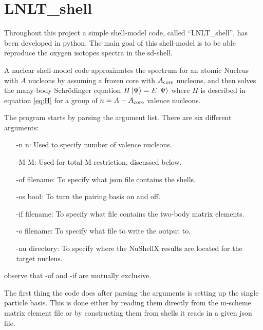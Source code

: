 \section{LNLT\_shell} \label{sec:CodeExpl}

Throughout this project a simple shell-model code, called ``LNLT\_shell'', has been developed in python. The main goal of this shell-model is to be able reproduce the oxygen isotopes spectra in the sd-shell.

A nuclear shell-model code approximates the spectrum for an atomic Nucleus with \(A\) nucleons by assuming a frozen core with \(A_{\rm{core}}\) nucleons, and then solves the many-body Schrödinger equation \(H\ket{\Psi}=E\ket{\Psi}\) where \(H\) is described in equation \ref{eq:H}
for a group of \(n=A-A_{\rm{core}}\) valence nucleons.



The program starts by parsing the argument list. There are six different arguments:
\begin{itemize}
\item[-n n:] Used to specify number of valence nucleons.
\item[-M M:] Used for total-M restriction, discussed below.
\item[-of filename:] To specify what json file contains the shells.
\item[-os bool:] To turn the pairing basis on and off.
\item[-if filename:] To specify what file contains the two-body matrix elements.
\item[-o filename:] To specify what file to write the output to.
\item[-nu directory:] To specify where the NuShellX results are located for the target nucleus.
\end{itemize}
observe that -of and -if are mutually exclusive.




The first thing the code does after parsing the arguments is setting up the single particle basis.
This is done either by reading them directly from the m-scheme matrix element file %
or by constructing them from shells it reads in a given json file.


